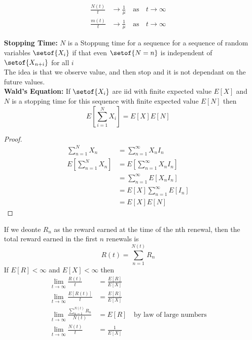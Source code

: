 \documentclass[answers,12pt,addpoints]{exam}
\begin{document}
\begin{definition}
    \begin{align*}
        \frac{N(t)}{t} &\to \frac{1}{\mu} \quad \text{as} \quad t \to \infty\\
        \frac{m(t)}{t} &\to \frac{1}{\mu} \quad \text{as} \quad t \to \infty
    \end{align*}
\end{definition}
\begin{definition}
    \textbf{Stopping Time:} $N$ is a Stoppung time for a sequence for a sequence of random variables $\setof{X_i}$ if that even $\setof{N=n}$ is independent of $\setof{X_{n+i}}$ for all $i$\\
    The idea is that we observe value, and then stop and it is not dependant on the future values.\\
    \textbf{Wald's Equation:}
    If $\setof{X_i}$ are iid with finite expected value $E[X]$ and $N$ is a stopping time for this sequence with finite expected value $E[N]$ then
    $$ E[\sum_{i=1}^{N} X_i] = E[X]E[N]$$
    \begin{proof}
        \begin{align*}
            \sum_{n=1}^{N} X_n &= \sum_{n=1}^{\infty} X_n I_n\\
            E[\sum_{n=1}^{N} X_n] &= E[\sum_{n=1}^{\infty} X_n I_n]\\
            &= \sum_{n=1}^{\infty} E[X_n I_n]\\
            &= E[X]\sum_{n=1}^{\infty} E[I_n]\\
            &= E[X]E[N]
        \end{align*}
    \end{proof}
\end{definition}
\begin{definition}
    If we deonte $R_n$ as the reward earned at the time of the nth renewal, then the total reward earned in the first $n$ renewals is
    $$ R(t) = \sum_{n=1}^{N(t)} R_n$$
    If $E[R] < \infty$ and $E[X] < \infty$ then
    \begin{align*}
        \lim_{t \to \infty} \frac{R(t)}{t} &= \frac{E[R]}{E[X]}\\
        \lim_{t \to \infty} \frac{E[R(t)]}{t} &= \frac{E[R]}{E[X]}\\
        \lim_{t \to \infty} \frac{\sum_{n=1}^{N(t)} R_n}{N(t)} &= E[R] \quad \text{by law of large numbers}\\
        \lim_{t \to \infty} \frac{N(t)}{t} &= \frac{1}{E[X]} 
    \end{align*}
\end{definition}
\end{document}
